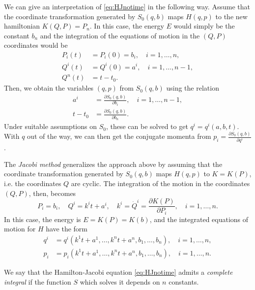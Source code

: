 \documentclass[english,fontsize=11pt,paper=a5,oneside]{scrbook}
\newcommand{\R}{\mathbb{R}}
\theoremstyle{definition}
\begin{document}
We can give an interpretation of \eqref{eq:HJnotime} in the following way.
Assume that the coordinate transformation generated by $S_0(q,b)$ maps $H(q,p)$ to the new hamiltonian $K(Q,P)=P_n$.
In this case, the energy $E$ would simply be the constant $b_n$ and the integration of the equations of motion in the $(Q,P)$ coordinates would be
\begin{align}
    P_i(t) &= P_i(0) = b_i, \quad i=1,\ldots,n,\\
    Q^i(t) &= Q^i(0) = a^i, \quad i=1,\ldots,n-1,\\
    Q^n(t) &= t- t_0.
\end{align}
Then, we obtain the variables $(q,p)$ from $S_0(q,b)$ using the relation
\begin{align}
    a^i &= \frac{\partial S_0(q,b)}{\partial b_i}, \quad i=1,\ldots,n-1,\\
    t-t_0 &= \frac{\partial S_0(q,b)}{\partial b_n}.
\end{align}
Under suitable assumptions on $S_0$, these can be solved to get $q^i = q^i(a,b,t)$. With $q$ out of the way, we can then get the conjugate momenta from $p_i = \frac{\partial S_0(q,b)}{\partial q^i}$.

The \emph{Jacobi method} generalizes the approach above by assuming that the coordinate transformation generated by $S_0(q,b)$ maps $H(q,p)$ to $K = K(P)$, i.e. the coordinates $Q$ are cyclic.
The integration of the motion in the coordinates $(Q,P)$, then, becomes
\begin{equation}\label{eq:JacobiM}
    P_i = b_i, \quad
    Q^i = k^i t + a^i, \quad
    k^i = \dot Q^i = \frac{\partial K(P)}{\partial P_i}, \quad
    i = 1,\ldots,n.
\end{equation}
In this case, the energy is $E = K(P) = K(b)$, and the integrated equations of motion for $H$ have the form
\begin{align}
    q^i &= q^i(k^1 t + a^1, \ldots, k^n t + a^n, b_1, \ldots, b_n), \quad i=1,\ldots,n,\\
    p_i &= p_i(k^1 t + a^1, \ldots, k^n t + a^n, b_1, \ldots, b_n), \quad i=1,\ldots,n.
\end{align}

\begin{tcolorbox}
    We say that the Hamilton-Jacobi equation \eqref{eq:HJnotime} admits a \emph{complete integral} if the function $S$ which solves it depends on $n$ constants.    
\end{tcolorbox}

\end{document}
